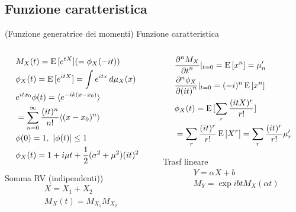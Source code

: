\documentclass[asd-beamer.tex]{subfiles}%
\begin{document}
\subsection{Funzione caratteristica}

\begin{frame}{(Funzione generatrice dei momenti) Funzione caratteristica}
\begin{columns}[T]
	\begin{column}{0.5\textwidth}
		\begin{align*}
		&M_X(t)=\E{[\exp{tX}]}(=\phi_X(-it))\\
		&\phi_X(t)=\E{[\exp{itX}]}=\int\exp{itx}\,d\mu_X(x)\\
		&\exp{itx_0}\phi(t)=\exv{\exp{-ik(x-x_0)}}\\
		&=\sum_{n=0}^{\infty}\frac{(it)^n}{n!}\exv{(x-x_0)^n}\\
		&\phi(0)=1,\ |\phi(t)|\leq1\\
		&\phi_X(t)=1+i\mu t+\frac{1}{2}(\sigma^2+\mu^2)(it)^2
		\end{align*}
		\begin{block}{Somma RV (indipendenti))}
			\begin{align*}
			&X=X_1+X_2\\
			&M_X(t)=M_{X_1}M_{X_2}
			\end{align*}
		\end{block}
	\end{column}
	\begin{column}{0.5\textwidth}
		\begin{align*}
		&\PDyn{t}{M_X}{n}|_{t=0}=\E{[x^n]}=\mu_n'\\
		&\PDyn{(it)}{\phi_X}{n}|_{t=0}=(-i)^n\E{[x^n]}\\
		&\phi_X(t)=\E{[\sum_r\frac{(itX)^r}{r!}]}\\
		&=\sum_r\frac{(it)^r}{r!}\E{[X^r]}=\sum_r\frac{(it)^r}{r!}\mu_r'
		\end{align*}
		\begin{block}{}\end{block}
		\begin{block}{Trasf lineare}
			\begin{align*}
			&Y=\alpha X+b\\
			&M_Y=\exp{ibt}M_X(\alpha t)
			\end{align*}
		\end{block}
	\end{column}
\end{columns}
\end{frame}
\end{document}
